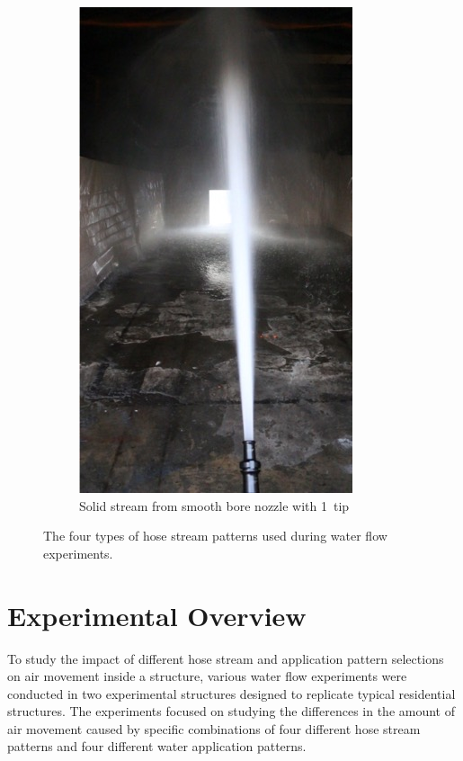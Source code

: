 \documentclass[12pt,oneside]{book}
\begin{document}
\begin{figure}[!ht]
\begin{subfigure}[b]{0.45\columnwidth}
		\includegraphics[width=0.75\columnwidth]{../Figures/Pictures/SB_70}
		\caption{Solid stream from smooth bore nozzle with 1~tip}
	\end{subfigure}
	\caption[Hose stream patterns used during experiments.]{The four types of hose stream patterns used during water flow experiments.}
	\label{fig:hose_streams}
\end{figure}

\clearpage

\chapter{Experimental Overview}
\label{chap:exp_overview}
To study the impact of different hose stream and application pattern selections on air movement inside a structure, various water flow experiments were conducted in two experimental structures designed to replicate typical residential structures. The experiments focused on studying the differences in the amount of air movement caused by specific combinations of four different hose stream patterns and four different water application patterns.
\end{document}
